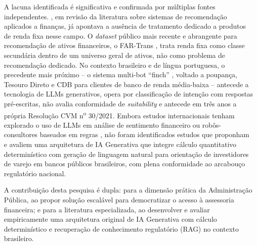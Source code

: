 A lacuna identificada \'e significativa e confirmada por m\'ultiplas
fontes independentes. \textcite{zibriczky2016}, em revis\~ao da
literatura sobre sistemas de recomenda\c{c}\~ao aplicados a finan\c{c}as,
j\'a apontava a aus\^encia de tratamento dedicado a produtos de renda
fixa nesse campo. O \textit{dataset} p\'ublico mais recente e abrangente
para recomenda\c{c}\~ao de ativos financeiros, o FAR-Trans
\autocite{sanzcruzado2024}, trata renda fixa como classe secund\'aria
dentro de um universo geral de ativos, n\~ao como problema de
recomenda\c{c}\~ao dedicado. No contexto brasileiro e de l\'ingua
portuguesa, o precedente mais pr\'oximo -- o sistema multi-bot
``finch'' \autocite{pinhanez2018}, voltado a poupan\c{c}a, Tesouro Direto e CDB
para clientes de banco de renda m\'edia-baixa -- antecede a tecnologia
de LLMs generativos, opera por classifica\c{c}\~ao de inten\c{c}\~ao com
respostas pr\'e-escritas, n\~ao avalia conformidade de \textit{suitability}
e antecede em tr\^es anos a pr\'opria Resolu\c{c}\~ao CVM
n\textsuperscript{o} 30/2021. Embora estudos internacionais
tenham explorado o uso de LLMs em an\'alise de sentimento financeiro
\autocite{lopezliratang2023} ou rob\^os-consultores baseados em regras
\autocite{dacunto2019}, n\~ao foram identificados estudos que proponham e
avaliem uma arquitetura de IA Generativa que integre c\'alculo
quantitativo determin\'istico com gera\c{c}\~ao de linguagem natural para
orienta\c{c}\~ao de investidores de varejo em bancos p\'ublicos
brasileiros, com plena conformidade ao arcabou\c{c}o regulat\'orio
nacional.

A contribui\c{c}\~ao desta pesquisa \'e dupla: para a dimens\~ao pr\'atica
da Administra\c{c}\~ao P\'ublica, ao propor solu\c{c}\~ao escal\'avel para
democratizar o acesso \`a assessoria financeira; e para a literatura
especializada, ao desenvolver e avaliar empiricamente uma arquitetura
original de IA Generativa com c\'alculo determin\'istico e recupera\c{c}\~ao
de conhecimento regulat\'orio (RAG) no contexto brasileiro.

